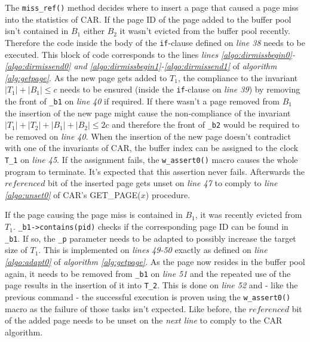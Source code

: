 	The \lstinline{miss_ref()} method decides where to insert a page that caused a page miss into the statistics of CAR. If the page ID of the page added to the buffer pool isn't contained in $B_1$ either $B_2$ it wasn't evicted from the buffer pool recently. Therefore the code inside the body of the \lstinline{if}-clause defined on \emph{line 38} needs to be executed. This block of code corresponds to the lines \emph{lines \ref{algo:dirmissbegin0}-\ref{algo:dirmissend0} and \ref{algo:dirmissbegin1}-\ref{algo:dirmissend1}} of \emph{algorithm \ref{alg:getpage}}. As the new page gets added to $T_1$, the compliance to the invariant $\left|T_1\right| + \left|B_1\right| \leq c$ needs to be ensured (inside the \lstinline{if}-clause on \emph{line 39}) by removing the front of \lstinline{_b1} on \emph{line 40} if required. If there wasn't a page removed from $B_1$ the insertion of the new page might cause the non-compliance of the invariant $\left|T_1\right| + \left|T_2\right| + \left|B_1\right| + \left|B_2\right| \leq 2c$ and therefore the front of \lstinline{_b2} would be required to be removed on \emph{line 40}. When the insertion of the new page doesn't contradict with one of the invariants of CAR, the buffer index can be assigned to the clock \lstinline{T_1} on \emph{line 45}. If the assignment fails, the \lstinline{w_assert0()} macro causes the whole program to terminate. It's expected that this assertion never fails. Afterwards the $referenced$ bit of the inserted page gets unset on \emph{line 47} to comply to \emph{line \ref{algo:unset0}} of CAR's GET\_PAGE($x$) procedure.
	
	If the page causing the page miss is contained in $B_1$, it was recently evicted from $T_1$. \lstinline{_b1->contains(pid)} checks if the corresponding page ID can be found in \lstinline{_b1}. If so, the \lstinline{_p} parameter needs to be adapted to possibly increase the target size of $T_1$. This is implemented on \emph{lines 49-50} exactly as defined on \emph{line \ref{algo:adapt0}} of \emph{algorithm \ref{alg:getpage}}. As the page now resides in the buffer pool again, it needs to be removed from \lstinline{_b1} on \emph{line 51} and the repeated use of the page results in the insertion of it into \lstinline{T_2}. This is done on \emph{line 52} and - like the previous command - the successful execution is proven using the \lstinline{w_assert0()} macro as the failure of those tasks isn't expected. Like before, the $referenced$ bit of the added page needs to be unset on the \emph{next line} to comply to the CAR algorithm.
	
